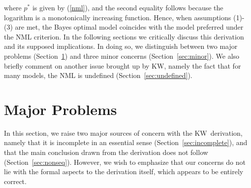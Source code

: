 \documentclass[authoryear]{elsarticle}
\newcommand{\kw}{KW}
\begin{document}
where $p^*$ is given by (\ref{nml}), and the second equality follows because
the logarithm is a monotonically increasing function.  Hence, when assumptions
(1)-(3) are met, the Bayes optimal model coincides
with the model preferred under the NML criterion.  In the following sections
we critically discuss this derivation and its supposed implications. In doing
so, we distinguish between two major problems (Section~\ref{sec:caveats})
and three minor concerns (Section~\ref{sec:minor}). We
also briefly comment on
another issue brought up by \kw, namely the
fact that for many models, the NML is undefined
(Section~\ref{sec:undefined}).

\section{Major Problems}
\label{sec:caveats}
In this section, we raise two major sources of concern with the \kw\
derivation, namely that it is incomplete in an essential sense
(Section~\ref{sec:incomplete}), and that the main conclusion drawn from
the derivation does not follow (Section~\ref{sec:nonseq}). However, we
wish to emphasize that our concerns do not lie with the formal
aspects to the derivation itself, which appears to be entirely correct.
\end{document}
